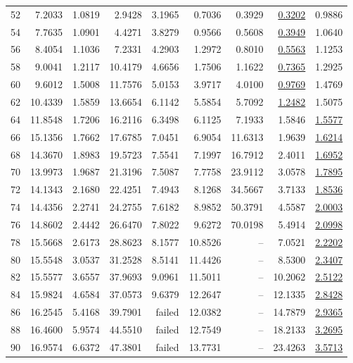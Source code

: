 \documentclass{ucalgthes1}
\theoremstyle{definition}
\begin{document}
\begin{table}[htb]
\begin{tabular}{| r | r | r | r | r | r | r | r | r |}
52 & 7.2033 & 1.0819 & 2.9428 & 3.1965 & 0.7036 & 0.3929 & \underline{0.3202} & 0.9886 \\
54 & 7.7635 & 1.0901 & 4.4271 & 3.8279 & 0.9566 & 0.5608 & \underline{0.3949} & 1.0640 \\
56 & 8.4054 & 1.1036 & 7.2331 & 4.2903 & 1.2972 & 0.8010 & \underline{0.5563} & 1.1253 \\
58 & 9.0041 & 1.2117 & 10.4179 & 4.6656 & 1.7506 & 1.1622 & \underline{0.7365} & 1.2925 \\
60 & 9.6012 & 1.5008 & 11.7576 & 5.0153 & 3.9717 & 4.0100 & \underline{0.9769} & 1.4769 \\
62 & 10.4339 & 1.5859 & 13.6654 & 6.1142 & 5.5854 & 5.7092 & \underline{1.2482} & 1.5075 \\
64 & 11.8548 & 1.7206 & 16.2116 & 6.3498 & 6.1125 & 7.1933 & 1.5846 & \underline{1.5577} \\
66 & 15.1356 & 1.7662 & 17.6785 & 7.0451 & 6.9054 & 11.6313 & 1.9639 & \underline{1.6214} \\
68 & 14.3670 & 1.8983 & 19.5723 & 7.5541 & 7.1997 & 16.7912 & 2.4011 & \underline{1.6952} \\
70 & 13.9973 & 1.9687 & 21.3196 & 7.5087 & 7.7758 & 23.9112 & 3.0578 & \underline{1.7895} \\
72 & 14.1343 & 2.1680 & 22.4251 & 7.4943 & 8.1268 & 34.5667 & 3.7133 & \underline{1.8536} \\
74 & 14.4356 & 2.2741 & 24.2755 & 7.6182 & 8.9852 & 50.3791 & 4.5587 & \underline{2.0003} \\
76 & 14.8602 & 2.4442 & 26.6470 & 7.8022 & 9.6272 & 70.0198 & 5.4914 & \underline{2.0998} \\
78 & 15.5668 & 2.6173 & 28.8623 & 8.1577 & 10.8526 & -- & 7.0521 & \underline{2.2202} \\
80 & 15.5548 & 3.0537 & 31.2528 & 8.5141 & 11.4426 & -- & 8.5300 & \underline{2.3407} \\
82 & 15.5577 & 3.6557 & 37.9693 & 9.0961 & 11.5011 & -- & 10.2062 & \underline{2.5122} \\
84 & 15.9824 & 4.6584 & 37.0573 & 9.6379 & 12.2647 & -- & 12.1335 & \underline{2.8428} \\
86 & 16.2545 & 5.4168 & 39.7901 & failed & 12.0382 & -- & 14.7879 & \underline{2.9365} \\
88 & 16.4600 & 5.9574 & 44.5510 & failed & 12.7549 & -- & 18.2133 & \underline{3.2695} \\
90 & 16.9574 & 6.6372 & 47.3801 & failed & 13.7731 & -- & 23.4263 & \underline{3.5713} \\

\end{tabular}
\end{table}
\end{document}
